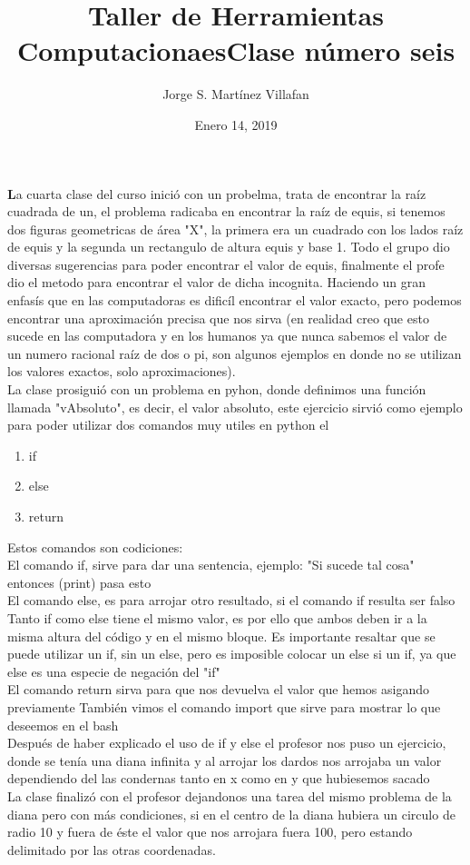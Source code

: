 \documentclass[letterpaper, 12pt, oneside]{article}%
\title{\Huge Taller de Herramientas Computacionaes}
\author{Jorge S. Martínez Villafan}
\date{Enero 14, 2019}
\begin{document}
\maketitle
\newpage
\title{Clase número seis}

\textbf La cuarta clase del curso inició con un probelma, trata de encontrar la raíz cuadrada de un, el problema radicaba en encontrar la raíz de equis, si tenemos dos  figuras geometricas de área "X", la primera era un cuadrado con los lados raíz de equis y la segunda un rectangulo de altura equis y base 1. Todo el grupo dio diversas sugerencias para poder encontrar el valor de equis, finalmente el profe dio el metodo para encontrar el valor de dicha incognita. Haciendo un gran enfasís que en las computadoras es dificíl encontrar el valor exacto, pero podemos encontrar una aproximación precisa que nos sirva (en realidad creo que esto sucede en las computadora y en los humanos ya que nunca sabemos el valor de un numero racional raíz de dos o pi, son algunos ejemplos en donde no se utilizan los valores exactos, solo aproximaciones).\\
La clase prosiguió con un problema en pyhon, donde definimos una función llamada "vAbsoluto", es decir, el valor absoluto, este ejercicio sirvió como ejemplo para poder utilizar dos comandos muy utiles en python el
\begin{enumerate}
\item if
\item else
\item return
\end{enumerate}
Estos comandos son codiciones:\\
El comando if, sirve para dar una sentencia, ejemplo: "Si sucede tal cosa" entonces (print) pasa esto\\
El comando else, es para arrojar otro resultado, si el comando if resulta ser falso\\
Tanto if como else tiene el mismo valor, es por ello que ambos deben ir a la misma altura del código y en el mismo bloque. Es importante resaltar que se puede utilizar un if, sin un else, pero es imposible colocar un else si un if, ya que else es una especie de negación del "if"\\
El comando return sirva para que nos devuelva el valor que hemos asigando previamente
También vimos el comando import que sirve para mostrar lo que deseemos en el bash\\

Después de haber explicado el uso de if y else el profesor nos puso un ejercicio, donde se tenía una diana infinita y al arrojar los dardos nos arrojaba un valor dependiendo del las condernas tanto en x como en y que hubiesemos sacado\\
La clase finalizó con el profesor dejandonos una tarea del mismo problema de la diana pero con más condiciones, si en el centro de la diana hubiera un circulo de radio 10 y fuera de éste el valor que nos arrojara fuera 100, pero estando delimitado por las otras coordenadas.
\end{document}
